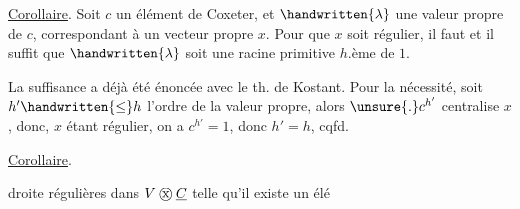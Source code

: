 \uline{Corollaire}. Soit $c$ un élément de Coxeter, et $\handwritten{\lambda}$ une valeur propre de $c$, correspondant à un vecteur propre $x$. Pour que $x$ soit régulier, il faut et il suffit que $\handwritten{\lambda}$ soit une racine primitive $h$.ème de $1$.
\reversemarginpar{}\normalmarginpar

La suffisance a déjà été énoncée avec le th. de Kostant. Pour la nécessité, soit $h'\handwritten{\leq}h$ l'ordre de la valeur propre, alors $\unsure{\mathbin{.}}c^{h'}$ centralise $x$, donc, $x$ étant régulier, on a $c^{h'}=1$, donc $h'=h$, cqfd.

\uline{Corollaire}.  droite régulières dans $V\mathbin{\text{\textcircled{x}}}\underline{C}$ telle qu'il existe un élé%
